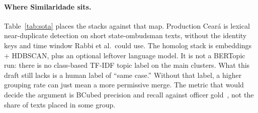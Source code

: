 \documentclass[acmlarge,screen]{acmart}
\begin{document}
\paragraph{Where Similaridade sits.}
Table~\ref{tab:sota} places the stacks against that map. Production Cear\'{a} is lexical near-duplicate detection on short state-ombudsman texts, without the identity keys and time window Rabbi et al.\ could use. The homolog stack is embeddings + HDBSCAN, plus an optional leftover language model. It is not a BERTopic run: there is no class-based TF-IDF topic label on the main clusters. What this draft still lacks is a human label of ``same case.'' Without that label, a higher grouping rate can just mean a more permissive merge. The metric that would decide the argument is BCubed precision and recall against officer gold~\cite{amigo2009bcubed}, not the share of texts placed in some group.
\end{document}
